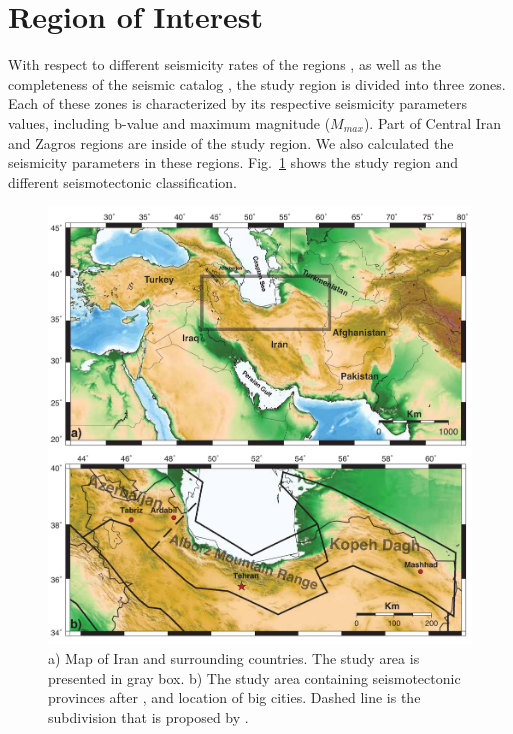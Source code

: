 \section{Region of Interest}

With respect to different seismicity rates of the regions \citep{Nemati2015}, as well as the completeness of the seismic catalog \citep{Zare2014} , the study region is divided into three zones. Each of these zones is characterized by its respective seismicity parameters values, including b-value and maximum magnitude ($M{_{max}}$). Part of Central Iran and Zagros regions are inside of the study region. We also calculated the seismicity parameters in these regions. Fig.~\ref{fig:Iran} shows the study region and different seismotectonic classification.

\begin{figure}[!ht] 
\centering
\includegraphics[scale=0.7]{figures/pdf/Figure1.pdf} 
\caption{ a) Map of Iran and surrounding countries. The study area is presented in gray box. b) The study area containing seismotectonic provinces after \citet{Mirzaei1998}, and location of big cities. Dashed line is the subdivision that is proposed by \citet{Karimiparidari2013}. }
 
\label{fig:Iran}
\end{figure}

